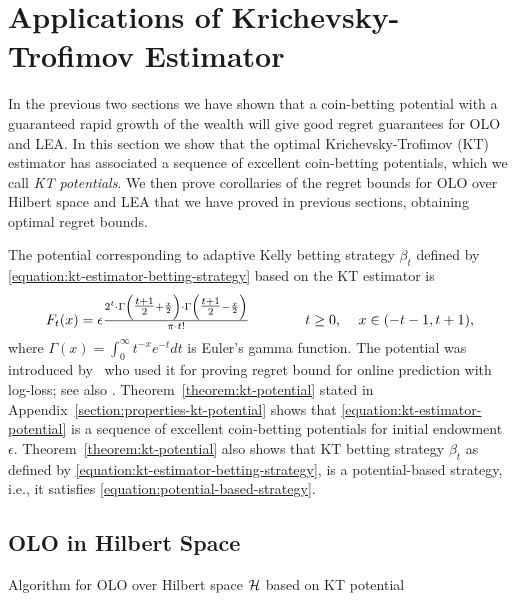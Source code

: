 \section{Applications of Krichevsky-Trofimov Estimator}
\label{section:kt-estimator}

In the previous two sections we have shown that a coin-betting potential with a
guaranteed rapid growth of the wealth will give good regret guarantees for
\ac{OLO} and \ac{LEA}. In this section we show that the optimal
Krichevsky-Trofimov (KT) estimator has associated a sequence of excellent
coin-betting potentials, which we call \emph{KT potentials}. We then prove
corollaries of the regret bounds for \ac{OLO} over Hilbert space and \ac{LEA}
that we have proved in previous sections, obtaining optimal regret bounds.

The potential corresponding to adaptive Kelly betting strategy
$\beta_t$ defined by \eqref{equation:kt-estimator-betting-strategy}
based on the KT estimator is
\begin{equation}
\label{equation:kt-estimator-potential}
F_t(x) = \epsilon \tfrac{2^t \cdot \Gamma \left( \tfrac{t+1}{2} + \frac{x}{2} \right) \cdot \Gamma \left( \tfrac{t+1}{2} - \frac{x}{2} \right)}{\pi \cdot t!}
\qquad \qquad \text{$t \ge 0$, \quad $x \in \left(-t-1, t+1\right)$,}
\end{equation}
where $\Gamma(x) = \int_0^\infty t^{-x} e^{-t} dt$ is Euler's gamma function.
The potential was introduced by~\citet{KrichevskyT81} who used it for proving
regret bound for online prediction with log-loss; see also \cite[Section
9.7]{Cesa-BianchiL06}.
Theorem~\ref{theorem:kt-potential} stated in
Appendix~\ref{section:properties-kt-potential} shows that
\eqref{equation:kt-estimator-potential} is a sequence of excellent coin-betting
potentials for initial endowment $\epsilon$. Theorem~\ref{theorem:kt-potential}
also shows that KT betting strategy $\beta_t$ as defined by
\eqref{equation:kt-estimator-betting-strategy}, is a potential-based strategy,
i.e., it satisfies \eqref{equation:potential-based-strategy}.

\subsection{OLO in Hilbert Space}
\label{sec:kt-olo}

\begin{algorithm}[t]
\caption{Algorithm for OLO over Hilbert space $\mathcal{H}$ based on KT potential
\label{algorithm:kt-hilbert-space-olo}}
\begin{algorithmic}
{
\ENDFOR
}
\end{algorithmic}
\end{algorithm}

